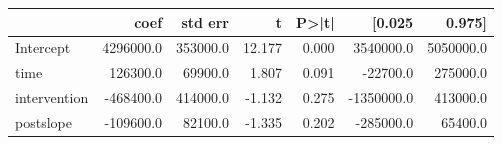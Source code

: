 \begin{tabular}{lrrrrrr}
\hline
{} &       coef &   std err &       t &  P>|t| &     [0.025 &     0.975] \\
\hline
Intercept    &  4296000.0 &  353000.0 &  12.177 &  0.000 &  3540000.0 &  5050000.0 \\
time         &   126300.0 &   69900.0 &   1.807 &  0.091 &   -22700.0 &   275000.0 \\
intervention &  -468400.0 &  414000.0 &  -1.132 &  0.275 & -1350000.0 &   413000.0 \\
postslope    &  -109600.0 &   82100.0 &  -1.335 &  0.202 &  -285000.0 &    65400.0 \\
\hline
\end{tabular}
